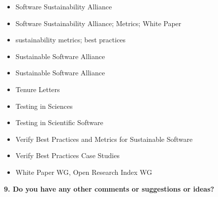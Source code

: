 \begin{itemize}
\item Software Sustainability Alliance
\item Software Sustainability Alliance; Metrics; White Paper
\item sustainability metrics; best practices
\item Sustainable Software Alliance
\item Sustainable Software Alliance
\item Tenure Letters
\item Testing in Sciences
\item Testing in Scientific Software
\item Verify Best Practices and Metrics for Sustainable Software
\item Verify Best Practices Case Studies
\item White Paper WG, Open Research Index WG
\end{itemize}

\noindent \textbf{9. Do you have any other comments or suggestions or ideas?}

